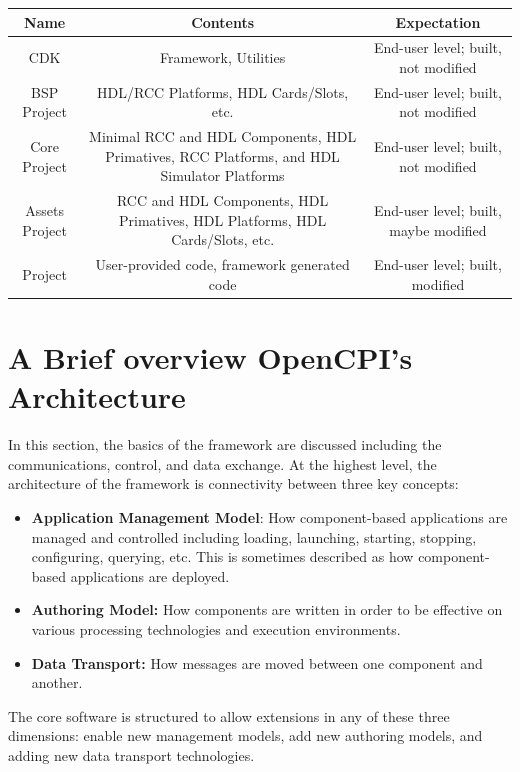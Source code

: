 \begin{center}
\begin{tabularx}{\textwidth}{|c|C|C|}
\hline
{}
Name & Contents & Expectation\\
\hline
CDK & Framework, Utilities & End-user level; built, not modified
\\
\hline
BSP Project & HDL/RCC Platforms, HDL Cards/Slots, etc.  & End-user level; built, not modified
\\
\hline
Core Project & Minimal RCC and HDL Components, HDL Primatives, RCC Platforms, and HDL Simulator Platforms & End-user level; built, not modified
\\
\hline
Assets Project & RCC and HDL Components, HDL Primatives, HDL Platforms, HDL Cards/Slots, etc.  & End-user level; built, maybe modified
\\
\hline
Project & User-provided code, framework generated code & End-user level; built, modified\\
\hline
\end{tabularx}
\end{center}

\newpage
\section{A Brief overview OpenCPI's Architecture}
In this section, the basics of the framework are discussed including the communications, control, and data exchange.
\label{sec:brief_ow_arch}
At the highest level, the architecture of the framework is connectivity between three key concepts:
\begin{itemize}
\item \textbf{Application Management Model}: How component-based applications are managed and controlled including loading, launching, starting, stopping, configuring, querying, etc. This is sometimes described as how component-based applications are deployed.
\item \textbf{Authoring Model:} How components are written in order to be effective on various
processing technologies and execution environments.
\item \textbf{Data Transport:} How messages are moved between one component and another.
\end{itemize}

The core software is structured to allow extensions in any of these three dimensions: enable new management models, add new authoring models, and adding new data transport technologies. \newline

